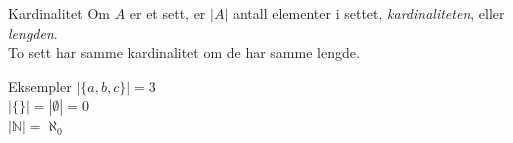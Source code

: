 \begin{frame}{Kardinalitet}
    Om $A$ er et sett, er $|A|$ antall elementer i settet, \textit{kardinaliteten}, eller \textit{lengden}.\\
    To sett har samme kardinalitet om de har samme lengde.
    \begin{block}{Eksempler}
        $|\{a, b, c\}| = 3$ \\
        $|\{\}| = |\emptyset| = 0$\\
        $|\mathbb{N}| = \aleph_0$
    \end{block}
\end{frame}
